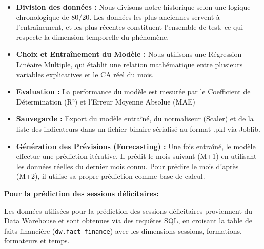 \begin{itemize}
\item \textbf{Division des données :} Nous divisons notre historique selon une logique chronologique de 80/20. Les données les plus anciennes servent à l'entraînement, et les plus récentes constituent l'ensemble de test, ce qui respecte la dimension temporelle du phénomène.
\item \textbf{Choix et Entraînement du Modèle :} Nous utilisons une Régression Linéaire Multiple, qui établit une relation mathématique entre plusieurs variables explicatives et le CA réel du mois.
\item  \textbf{Evaluation :}  La performance du modèle est mesurée par le Coefficient de Détermination (R²) et l'Erreur Moyenne Absolue (MAE) 

\item \textbf{Sauvegarde :} Export du modèle entraîné, du normaliseur (Scaler) et de la liste des indicateurs dans un fichier binaire sérialisé au format .pkl via Joblib.
\item \textbf{Génération des Prévisions (Forecasting) :} Une fois entraîné, le modèle effectue une prédiction itérative. Il prédit le mois suivant (M+1) en utilisant les données réelles du dernier mois connu. Pour prédire le mois d'après (M+2), il utilise sa propre prédiction  comme base de calcul. 
\end{itemize}


\noindent\textbf{Pour la prédiction des sessions déficitaires:}

Les données utilisées pour la prédiction des sessions déficitaires proviennent du Data Warehouse et sont obtenues via des requêtes SQL, en croisant la table de faits financière (\texttt{dw.fact\_finance}) avec les dimensions sessions, formations, formateurs et temps.


